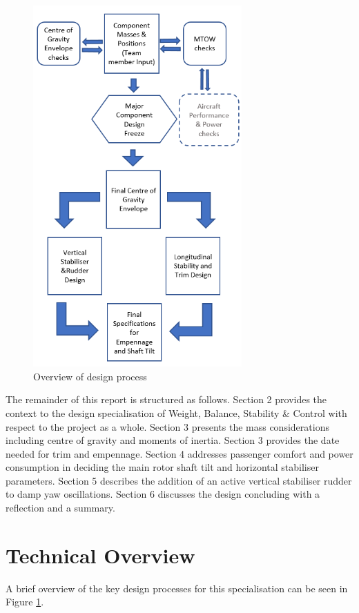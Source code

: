 \documentclass[11pt,a4paper]{article}
\begin{document}
\begin{figure}
\begin{center}
    \includegraphics[width=8cm]{Flowchart.PNG}
\end{center}
    \caption{Overview of design process}
    \label{fig:flow}
\end{figure}
The remainder of this report is structured as follows. Section 2 provides the  context to the design specialisation of Weight, Balance, Stability \& Control with respect to the project as a whole. Section 3 presents the mass considerations including centre of gravity and moments of inertia. Section 3 provides the date needed for trim and empennage. Section 4 addresses passenger comfort and power consumption in deciding the main rotor shaft tilt and horizontal stabiliser parameters. Section 5 describes the addition of an active vertical stabiliser rudder to damp yaw oscillations. Section 6 discusses the design concluding with a reflection and a summary.
\section{Technical Overview}
A brief overview of the key design processes for this specialisation can be seen in  Figure \ref{fig:flow}.
\end{document}
